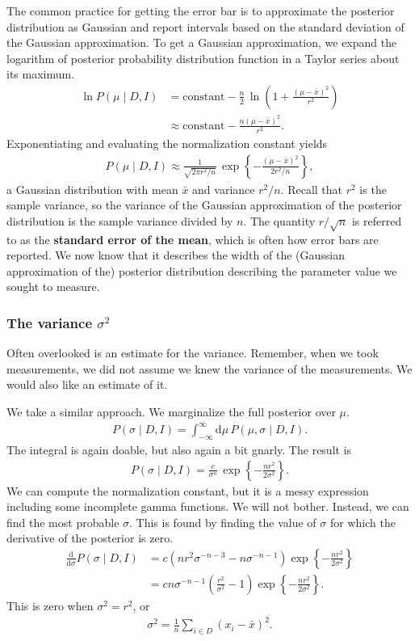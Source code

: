 The common practice for getting the error bar  is to
approximate the posterior distribution as Gaussian and report
intervals based on the standard deviation of the Gaussian
approximation.  To get a Gaussian approximation, we expand the
logarithm of posterior probability distribution function in a Taylor
series about its maximum.
\begin{align}
\ln P(\mu \mid D, I) &= \text{constant} - \frac{n}{2}\,\ln\left(1 + \frac{(\mu - \bar{x})^2}{r^2}\right) \\
&\approx \text{constant} - \frac{n(\mu - \bar{x})^2}{r^2}.
\end{align}
Exponentiating and evaluating the normalization constant yields
\begin{align}
  P(\mu\mid D, I) \approx \frac{1}{\sqrt{2\pi r^2/n}}\,\exp\left\{
-\frac{(\mu - \bar{x})^2}{2r^2/n}
\right\},
\end{align}
a Gaussian distribution with mean $\bar{x}$ and variance $r^2/n$.
Recall that $r^2$ is the sample variance, so the variance of the
Gaussian approximation of the posterior distribution is the sample
variance divided by $n$.  The quantity $r/\sqrt{n}$ is referred to as
the \textbf{standard error of the mean}, which is often how error bars
are reported.  We now know that it describes the width of the
(Gaussian approximation of the) posterior distribution describing the
parameter value we sought to measure.

\subsubsection{The variance $\sigma^2$}
Often overlooked is an estimate for the variance.  Remember, when we
took measurements, we did not assume we knew the variance of the
measurements.  We would also like an estimate of it.

We take a similar approach.  We marginalize the full posterior over
$\mu$.
\begin{align}
P(\sigma\mid D, I) = \int_{-\infty}^\infty \mathrm{d}\mu\,P(\mu,\sigma\mid D, I).
\end{align}
The integral is again doable, but also again a bit gnarly.  The result is
\begin{align}
P(\sigma\mid D, I) = \frac{c}{\sigma^n}\,\exp\left\{-\frac{nr^2}{2\sigma^2}\right\}.
\end{align}
We can compute the normalization constant, but it is a messy
expression including some incomplete gamma functions.  We will not
bother.  Instead, we can find the most probable $\sigma$.  This is
found by finding the value of $\sigma$ for which the derivative of the
posterior is zero.
\begin{align}
  \frac{\mathrm{d}}{\mathrm{d}\sigma}P(\sigma \mid D, I) &=
  c(nr^2\sigma^{-n-3} - n \sigma^{-n-1})\exp\left\{-\frac{nr^2}{2\sigma^2}\right\} \\
  &= c n \sigma^{-n-1}\left(\frac{r^2}{\sigma^2} - 1\right)\exp\left\{-\frac{nr^2}{2\sigma^2}\right\}.
\end{align}
This is zero when $\sigma^2 = r^2$, or
\begin{align}
    \sigma^2 = \frac{1}{n}\sum_{i\in D}(x_i - \bar{x})^2.
\end{align}

